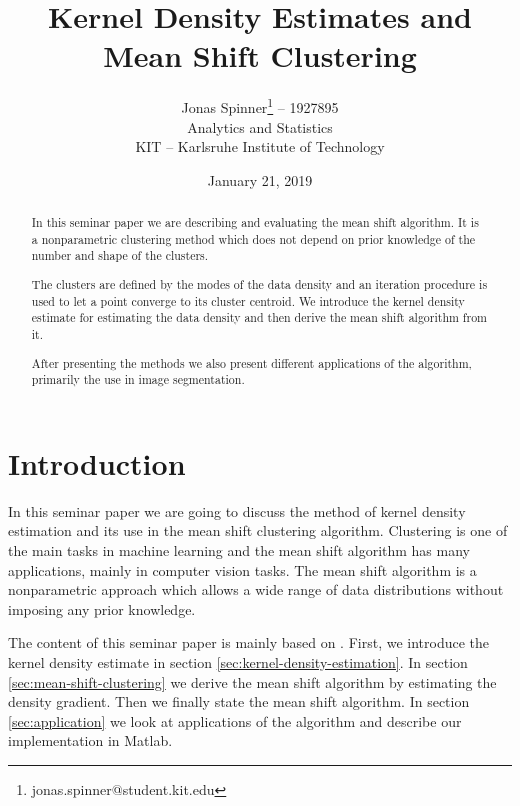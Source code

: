 \documentclass{article}
\begin{document}
\title{Kernel Density Estimates and Mean Shift Clustering}
\author{Jonas Spinner\thanks{jonas.spinner@student.kit.edu} \enspace -- 1927895\\
	Analytics and Statistics\\
	KIT -- Karlsruhe Institute of Technology}
\date{January 21, 2019}
\maketitle

\newpage

\tableofcontents

\newpage

\listoffigures

\listoftables

\listofalgorithms

\listofcodes


\newpage


\begin{abstract}
	In this seminar paper we are describing and evaluating the mean shift algorithm. It is a nonparametric clustering method which does not depend on prior knowledge of the number and shape of the clusters.
	
	The clusters are defined by the modes of the data density and an iteration procedure is used to let a point converge to its cluster centroid. We introduce the kernel density estimate for estimating the data density and then derive the mean shift algorithm from it.
	
	After presenting the methods we also present different applications of the algorithm, primarily the use in image segmentation.
\end{abstract}

\section{Introduction}

In this seminar paper we are going to discuss the method of kernel density estimation and its use in the mean shift clustering algorithm. Clustering is one of the main tasks in machine learning and the mean shift algorithm has many applications, mainly in computer vision tasks. The mean shift algorithm is a nonparametric approach which allows a wide range of data distributions without imposing any prior knowledge.

The content of this seminar paper is mainly based on \cite{Comaniciu.2002}. First, we introduce the kernel density estimate in section \ref{sec:kernel-density-estimation}. In section \ref{sec:mean-shift-clustering} we derive the mean shift algorithm by estimating the density gradient. Then we finally state the mean shift algorithm. In section \ref{sec:application} we look at applications of the algorithm and describe our implementation in Matlab.
\end{document}
